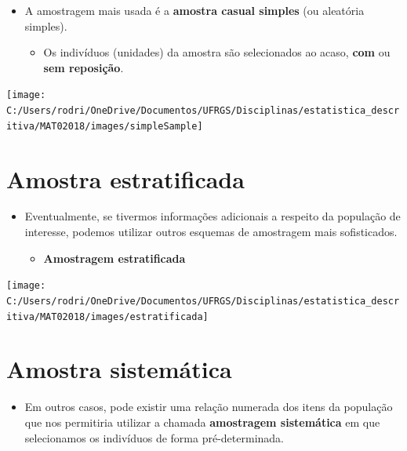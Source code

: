\documentclass[]{tufte-book}
\providecommand{\tightlist}{%
  \setlength{\itemsep}{0pt}\setlength{\parskip}{0pt}}
\begin{document}
\begin{itemize}
\tightlist
\item
  A amostragem mais usada é a \textbf{amostra casual simples} (ou
  aleatória simples).

  \begin{itemize}
  \tightlist
  \item
    Os indivíduos (unidades) da amostra são selecionados ao acaso,
    \textbf{com} ou \textbf{sem reposição}.
  \end{itemize}
\end{itemize}

\begin{center}\texttt{[image: C:/Users/rodri/OneDrive/Documentos/UFRGS/Disciplinas/estatistica\_descritiva/MAT02018/images/simpleSample]} \end{center}

\hypertarget{amostra-estratificada}{%
\section{Amostra estratificada}\label{amostra-estratificada}}

\begin{itemize}
\item
  Eventualmente, se tivermos informações adicionais a respeito da
  população de interesse, podemos utilizar outros esquemas de amostragem
  mais sofisticados.

  \begin{itemize}
  \tightlist
  \item
    \textbf{Amostragem estratificada}
  \end{itemize}
\end{itemize}

\begin{center}\texttt{[image: C:/Users/rodri/OneDrive/Documentos/UFRGS/Disciplinas/estatistica\_descritiva/MAT02018/images/estratificada]} \end{center}

\hypertarget{amostra-sistemuxe1tica}{%
\section{Amostra sistemática}\label{amostra-sistemuxe1tica}}

\begin{itemize}
\tightlist
\item
  Em outros casos, pode existir uma relação numerada dos itens da
  população que nos permitiria utilizar a chamada \textbf{amostragem
  sistemática} em que selecionamos os indivíduos de forma
  pré-determinada.
\end{itemize}
\end{document}
